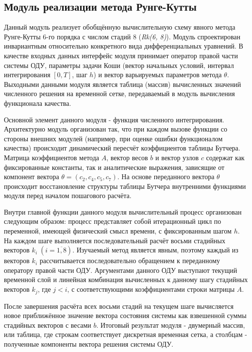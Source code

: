 \subsection{Модуль реализации метода Рунге-Кутты}
Данный модуль реализует обобщённую вычислительную схему явного метода Рунге-Кутты 6-го порядка с числом стадий 8 (\textit{Rk(6, 8)}). Модуль спроектирован инвариантным относительно конкретного вида дифференциальных уравнений. В качестве входных данных интерфейс модуля принимает оператор правой части системы ОДУ, параметры задачи Коши (вектор начальных условий, интервал интегрирования $[0, T]$, шаг $h$) и вектор варьируемых параметров метода $\theta$. Выходными данными модуля является таблица (массив) вычисленных значений численного решения на временной сетке, передаваемый в модуль вычисления функционала качества.

Основной элемент данного модуля - функция численного интегрирования. Архитектурно модуль организован так, что при каждом вызове функции со стороны внешних модулей (например, при оценке ошибки функционалом качества) происходит динамический пересчёт коэффициентов таблицы Бутчера. Матрица коэффициентов метода $A$, вектор весов $b$ и вектор узлов $c$ содержат как фиксированные константы, так и аналитические выражения, зависящие от компонент вектора $\theta = (c_2, c_4, c_5, c_7)$. На основе переданного вектора $\theta$ происходит восстановление структуры таблицы Бутчера внутренними функциями модуля перед началом пошагового расчёта.

Внутри главной функции данного модуля вычислительный процесс организован следующим образом: процесс представляет собой итерационный цикл по переменной, имеющей физический смысл времени, с фиксированным шагом $h$. На каждом шаге выполняется последовательный расчёт восьми стадийных векторов $k_i\; (i = \overline{1, 8})$. Изучаемый метод является явным, поэтому каждый из векторов $k_i$ рассчитывается последовательно обращением к переданному оператору правой части ОДУ. Аргументами данного ОДУ выступают текущий временной слой и линейная комбинация вычисленных к данному шагу стадийных векторов $k_j$, где $j < i$, с соответствующими коэффициентами строки матрицы $A$.

После завершения расчёта всех восьми стадий на текущем шаге вычисляется новое приближённое значение вектора состояния системы как взвешенной суммы стадийных векторов с весами $b$. Итоговый результат модуля - двумерный массив, или таблица, где строкам соответствует дискретная временная сетка, а столбцам - полученные компоненты вектора решения системы ОДУ.
